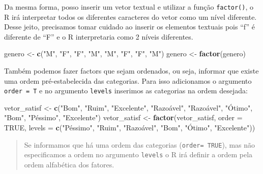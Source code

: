 \documentclass[]{book}
\newenvironment{Shaded}{\begin{snugshade}}{\end{snugshade}}
\newcommand{\DataTypeTok}[1]{\textcolor[rgb]{0.13,0.29,0.53}{#1}}
\newcommand{\KeywordTok}[1]{\textcolor[rgb]{0.13,0.29,0.53}{\textbf{#1}}}
\newcommand{\NormalTok}[1]{#1}
\newcommand{\OtherTok}[1]{\textcolor[rgb]{0.56,0.35,0.01}{#1}}
\newcommand{\StringTok}[1]{\textcolor[rgb]{0.31,0.60,0.02}{#1}}
\theoremstyle{definition}
\theoremstyle{definition}
\theoremstyle{definition}
\theoremstyle{remark}
\begin{document}
Da mesma forma, posso inserir um vetor textual e utilizar a função \texttt{factor()}, o R irá interpretar todos os diferentes caracteres do vetor como um nível diferente. Desse jeito, precisamos tomar cuidado ao inserir os elementos textuais pois ``f'' é diferente de ``F'' e o R interpretaria como 2 níveis diferentes.

\begin{Shaded}
\begin{Highlighting}[]
\NormalTok{genero <-}\StringTok{ }\KeywordTok{c}\NormalTok{(}\StringTok{"M"}\NormalTok{, }\StringTok{"F"}\NormalTok{, }\StringTok{"F"}\NormalTok{, }\StringTok{"M"}\NormalTok{, }\StringTok{"M"}\NormalTok{, }\StringTok{"F"}\NormalTok{, }\StringTok{"F"}\NormalTok{, }\StringTok{"M"}\NormalTok{)}
\NormalTok{genero <-}\StringTok{ }\KeywordTok{factor}\NormalTok{(genero)}
\end{Highlighting}
\end{Shaded}

Também podemos fazer factors que sejam ordenados, ou seja, informar que existe uma ordem pré-estabelecida das categorias. Para isso adicionamos o argumento \texttt{order\ =\ T} e no argumento \texttt{levels} inserimos as categorias na ordem desejada:

\begin{Shaded}
\begin{Highlighting}[]
\NormalTok{vetor_satisf <-}\StringTok{ }\KeywordTok{c}\NormalTok{(}\StringTok{"Bom"}\NormalTok{, }\StringTok{"Ruim"}\NormalTok{, }\StringTok{"Excelente"}\NormalTok{, }\StringTok{"Razoável"}\NormalTok{, }\StringTok{"Razoável"}\NormalTok{, }\StringTok{"Ótimo"}\NormalTok{, }\StringTok{"Bom"}\NormalTok{, }\StringTok{"Péssimo"}\NormalTok{, }\StringTok{"Excelente"}\NormalTok{)}
\NormalTok{vetor_satisf <-}\StringTok{ }\KeywordTok{factor}\NormalTok{(vetor_satisf, }\DataTypeTok{order =} \OtherTok{TRUE}\NormalTok{, }\DataTypeTok{levels =} \KeywordTok{c}\NormalTok{(}\StringTok{"Péssimo"}\NormalTok{, }\StringTok{"Ruim"}\NormalTok{, }\StringTok{"Razoável"}\NormalTok{, }\StringTok{"Bom"}\NormalTok{, }\StringTok{"Ótimo"}\NormalTok{, }\StringTok{"Excelente"}\NormalTok{))}
\end{Highlighting}
\end{Shaded}

\begin{quote}
Se informamos que há uma ordem das categorias (\texttt{order=\ TRUE}), mas não especificamos a ordem no argumento \texttt{levels} o R irá definir a ordem pela ordem alfabética dos fatores.
\end{quote}
\end{document}

